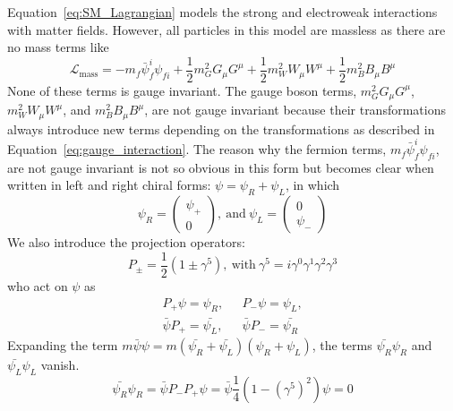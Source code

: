 Equation~\ref{eq:SM_Lagrangian} models the strong and electroweak interactions with matter fields.
However, all particles in this model are massless as there are no mass terms like
\begin{equation}\label{eq:mass_Lagrangian}
    \mathcal{L}_{\text{mass}} = - m_{f} \bar{\psi}^{i}_{f} \psi_{fi}
                                + \frac{1}{2} m^{2}_{G} G_{\mu}G^{\mu}
                                + \frac{1}{2} m^{2}_{W} W_{\mu}W^{\mu}
                                + \frac{1}{2} m^{2}_{B} B_{\mu}B^{\mu}
\end{equation}
None of these terms is gauge invariant.
The gauge boson terms, $m^{2}_{G} G_{\mu}G^{\mu}$, $m^{2}_{W} W_{\mu}W^{\mu}$, and $m^{2}_{B} B_{\mu}B^{\mu}$,
are not gauge invariant because their transformations always introduce new terms depending on the transformations as described in Equation~\ref{eq:gauge_interaction}. 
The reason why the fermion terms, $m_{f} \bar{\psi}^{i}_{f} \psi_{fi}$, are not gauge invariant is not so obvious in this form 
but becomes clear when written in left and right chiral forms: $\psi = \psi_{R} + \psi_{L}$,
in which 
\begin{equation}\label{eq:psi_chiral}
    \psi_{R} = \begin{pmatrix} \psi_{+} \\ 0 \end{pmatrix}, 
    ~\text{and}~
    \psi_{L} = \begin{pmatrix} 0 \\ \psi_{-} \end{pmatrix}
\end{equation}
We also introduce the projection operators:
\begin{equation}\label{eq:projection_op}
    P_{\pm} = \frac{1}{2}(1 \pm \gamma^{5}), ~\text{with}~ \gamma^{5} = i\gamma^{0}\gamma^{1}\gamma^{2}\gamma^{3}
\end{equation}
who act on $\psi$ as
\begin{equation}\label{eq:proj_psi}
  \begin{split}
    P_{+}\psi = \psi_{R}, & ~~~ P_{-}\psi = \psi_{L}, \\
    \bar{\psi}P_{+} = \bar{\psi_{L}}, & ~~~ \bar{\psi}P_{-} = \bar{\psi_{R}}
  \end{split}
\end{equation}
Expanding the term $m\bar{\psi} \psi = m(\bar{\psi_{R}} + \bar{\psi_{L}}) (\psi_{R} + \psi_{L})$,
the terms $\bar{\psi_{R}}\psi_{R}$ and $\bar{\psi_{L}}\psi_{L}$ vanish.
\begin{equation}\label{eq:RR_term}
    \bar{\psi_{R}}\psi_{R} = \bar{\psi} P_{-}P_{+} \psi = \bar{\psi} \frac{1}{4} (1 - (\gamma^{5})^{2}) \psi = 0
\end{equation}
